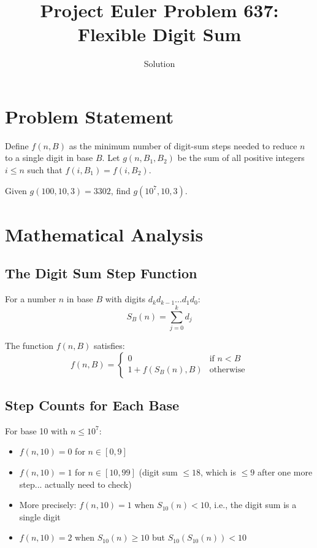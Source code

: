 \documentclass[12pt]{article}
\title{Project Euler Problem 637: Flexible Digit Sum}
\author{Solution}
\date{}
\begin{document}
\maketitle

\section{Problem Statement}

Define $f(n,B)$ as the minimum number of digit-sum steps needed to reduce $n$ to a single digit in base $B$. Let $g(n,B_1,B_2)$ be the sum of all positive integers $i \le n$ such that $f(i,B_1) = f(i,B_2)$.

Given $g(100,10,3) = 3302$, find $g(10^7, 10, 3)$.

\section{Mathematical Analysis}

\subsection{The Digit Sum Step Function}

For a number $n$ in base $B$ with digits $d_k d_{k-1} \ldots d_1 d_0$:
\[
S_B(n) = \sum_{j=0}^{k} d_j
\]

The function $f(n,B)$ satisfies:
\[
f(n,B) = \begin{cases} 0 & \text{if } n < B \\ 1 + f(S_B(n), B) & \text{otherwise} \end{cases}
\]

\subsection{Step Counts for Each Base}

For base 10 with $n \le 10^7$:
\begin{itemize}
    \item $f(n,10) = 0$ for $n \in [0,9]$
    \item $f(n,10) = 1$ for $n \in [10,99]$ (digit sum $\le 18$, which is $\le 9$ after one more step... actually need to check)
    \item More precisely: $f(n,10) = 1$ when $S_{10}(n) < 10$, i.e., the digit sum is a single digit
    \item $f(n,10) = 2$ when $S_{10}(n) \ge 10$ but $S_{10}(S_{10}(n)) < 10$
\end{itemize}
\end{document}
